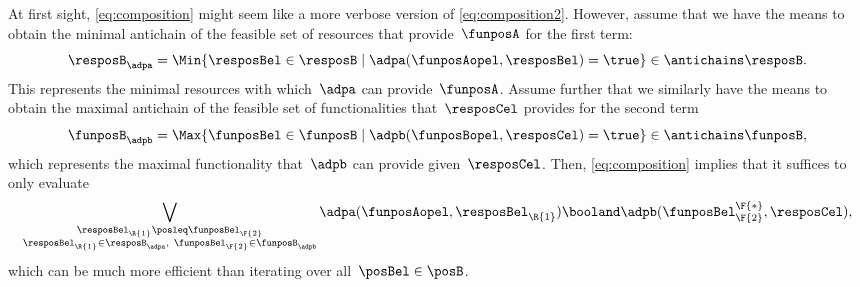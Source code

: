 \begin{remark}
    At first sight, \cref{eq:composition} might seem like a more verbose version of \cref{eq:composition2}.
    However, assume that we have the means to obtain the minimal antichain of the feasible set of resources that provide~$\funposA$ for the first term:
    \begin{equation*}
        \resposB_\adpa = \Min \{\resposBel\in \resposB \mid \adpa(\funposAopel,\resposBel)=\true\} \in \antichains \resposB.
    \end{equation*}
    This represents the minimal resources with which~$\adpa$ can provide~$\funposA$.
    Assume further that we similarly have the means to obtain the maximal antichain of the feasible set of functionalities that~$\resposCel$ provides for the second term
    \begin{equation*}
        \funposB_\adpb = \Max \{\funposBel\in \funposB \mid \adpb(\funposBopel,\resposCel)=\true\} \in \antichains \funposB,
    \end{equation*}
    which represents the maximal functionality that~$\adpb$ can provide given~$\resposCel$.
    Then, \cref{eq:composition} implies that it suffices to only evaluate
    \begin{equation*}
        \bigvee_{\substack{\resposBel_\R{1}\posleq\funposBel_\F{2} \\ \resposBel_\R{1}\in \resposB_\adpa,~ \funposBel_\F{2}\in\funposB_\adpb }} \adpa(\funposAopel,\resposBel_\R{1}) \booland \adpb(\funposBel_\F{2}^\F{*},\resposCel),
    \end{equation*}
    which can be much more efficient than iterating over all~$\posBel\in \posB$.
\end{remark}


